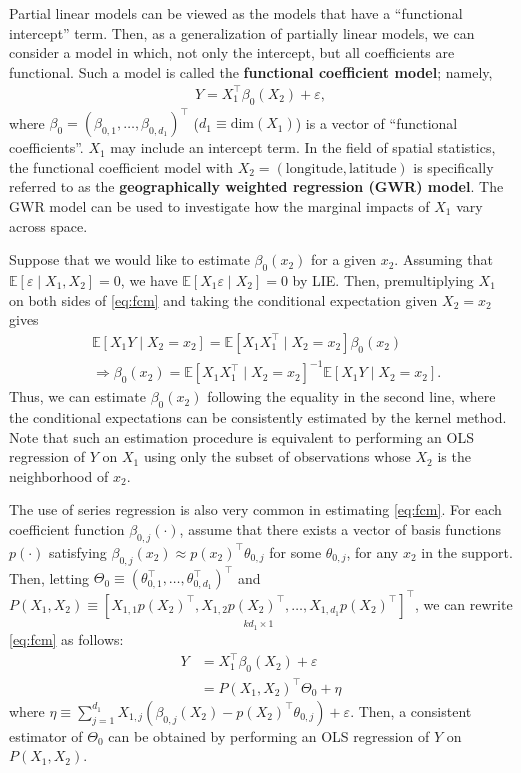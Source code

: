 \documentclass[10.5pt, A4paper, openany, uplatex]{book}
\newcommand{\eps}{\varepsilon}
\newcommand{\E}{\mathbb{E}}
\numberwithin{equation}{section}
\begin{document}
Partial linear models can be viewed as the models that have a ``functional intercept'' term.
Then, as a generalization of partially linear models, we can consider a model in which, not only the intercept, but all coefficients are functional.
Such a model is called the \textbf{functional coefficient model}; namely, 
\begin{align}\label{eq:fcm}
	Y = X_1^\top\beta_0(X_2) + \eps,
\end{align}
where $\beta_0 = (\beta_{0,1}, \ldots, \beta_{0,d_1})^\top$ ($d_1 \equiv \text{dim}(X_1)$) is a vector of ``functional coefficients''.
$X_1$ may include an intercept term.
In the field of spatial statistics, the functional coefficient model with $X_2 = (\text{longitude}, \text{latitude})$ is specifically referred to as the \textbf{geographically weighted regression (GWR) model}.
The GWR model can be used to investigate how the marginal impacts of $X_1$ vary across space.

Suppose that we would like to estimate $\beta_0(x_2)$ for a given $x_2$.
Assuming that $\E[\eps \mid X_1, X_2] = 0$, we have $\E[X_1 \eps \mid X_2] = 0$ by LIE.
Then, premultiplying $X_1$ on both sides of \eqref{eq:fcm} and taking the conditional expectation given $X_2 = x_2$ gives
\begin{align*}
	& \E[ X_1 Y \mid X_2 = x_2] = \E[ X_1  X_1^\top \mid X_2 = x_2] \beta_0(x_2)\\
	& \Longrightarrow \beta_0(x_2) = \E[ X_1  X_1^\top \mid X_2 = x_2]^{-1} \E[ X_1 Y \mid X_2 = x_2].
\end{align*}
Thus, we can estimate $\beta_0(x_2)$ following the equality in the second line, where the conditional expectations can be consistently estimated by the kernel method.
Note that such an estimation procedure is equivalent to performing an OLS regression of $Y$ on $X_1$ using only the subset of observations whose $X_2$ is the neighborhood of $x_2$.

The use of series regression is also very common in estimating \eqref{eq:fcm}.
For each coefficient function $\beta_{0,j}(\cdot)$, assume that there exists a vector of basis functions $p(\cdot)$ satisfying $\beta_{0,j}(x_2) \approx p(x_2)^\top \theta_{0,j}$ for some $\theta_{0,j}$, for any $x_2$ in the support.
Then, letting $\Theta_0 \equiv (\theta_{0,1}^\top, \ldots, \theta_{0,d_1}^\top)^\top$ and $P(X_1, X_2) \equiv \underset{k d_1 \times 1}{\left[X_{1,1}p(X_2)^\top, X_{1,2}p(X_2)^\top, \ldots, X_{1,d_1}p(X_2)^\top \right]^\top}$, we can rewrite \eqref{eq:fcm} as follows:
\begin{align*}
	Y
	& = X_1^\top\beta_0(X_2) + \eps\\
	& = P(X_1, X_2)^\top\Theta_0 + \eta
\end{align*}
where $\eta \equiv \sum_{j = 1}^{d_1}X_{1,j}(\beta_{0,j}(X_2) - p(X_2)^\top \theta_{0,j}) + \eps$.
Then, a consistent estimator of $\Theta_0$ can be obtained by performing an OLS regression of $Y$ on $P(X_1, X_2)$.
\end{document}
